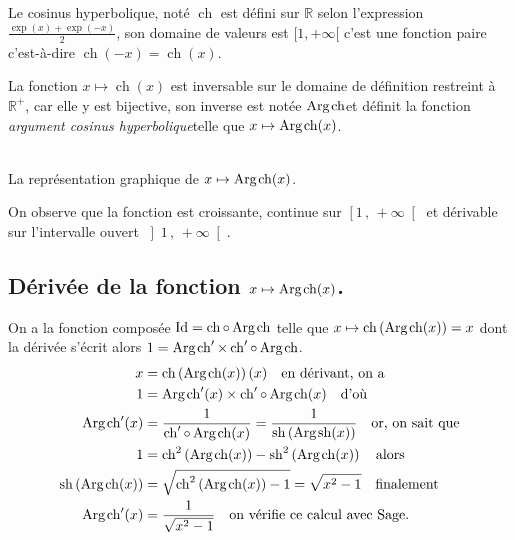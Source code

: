 \documentclass[a4paper,12pt]{report}
\def\eclaire{\mathbb}
\def\R{\ensuremath{\eclaire R}}
\def\Id{\ensuremath{\mathrm{Id}}}
\renewcommand{\sinh}{\mathop{\mathrm{sh}}}
\renewcommand{\cosh}{\mathop{\mathrm{ch}}}
\renewcommand{\arg}{\mathop{\mathrm{Arg}}}
\begin{document}
Le cosinus hyperbolique, noté $\cosh$ est défini sur $\R$ selon l'expression $\frac{\exp(x)+\exp(-x)}{2}$, son domaine de valeurs est $[1, +\infty [$ 
c'est une fonction paire c'est-à-dire $\cosh(-x)=\cosh(x)$.


La fonction $x \mapsto \cosh(x)$ est inversable sur le domaine de définition restreint à $\R^+$, car elle y est bijective, son inverse est notée \og $ \arg\mspace{-1mu}\cosh $\fg et définit la fonction \og\emph{argument cosinus hyperbolique}\fg telle que $x \mapsto \arg\mspace{-1mu}\cosh(x)$.


\begin{center}
 \\
La représentation graphique de $x \mapsto \arg\mspace{-1mu}\cosh(x)$.
\end{center}
On observe que la fonction est croissante, continue sur $\left[1\,,\,+\infty \right[ $ et dérivable sur l'intervalle ouvert $\left]1\,,\,+\infty \right[ $.
                                                                                               

\subsection{Dérivée de la fonction $x \mapsto \arg\mspace{-1mu}\cosh(x)$.}
On a la fonction composée $\Id = \cosh \circ \arg\mspace{-1mu}\cosh$ telle que $x\mapsto\cosh\left(\arg\mspace{-1mu}\cosh(x)\right)=x$ dont la dérivée s'écrit alors $1= \arg\mspace{-1mu}\cosh\nolimits' \times \cosh\nolimits'\circ\arg\mspace{-1mu}\cosh$.
\begin{align*}
x & =\cosh\left(\arg\mspace{-1mu}\cosh(x)\right)(x) \quad \textrm{en dérivant, on a}\\
1 & = \arg\mspace{-1mu}\cosh\nolimits'(x) \times \cosh\nolimits'\circ\arg\mspace{-1mu}\cosh(x) \quad \textrm{d'où}\\
\arg\mspace{-1mu}\cosh\nolimits'(x) & =\frac{1}{ \cosh\nolimits'\circ\arg\mspace{-1mu}\cosh(x)}=\frac{1}{ \sinh\left(\arg\mspace{-1mu}\sinh(x)\right)}\quad \textrm{or, on sait que}\\
1 & = \cosh\nolimits^2\left(\arg\mspace{-1mu}\cosh(x)\right) - \sinh\nolimits^2\left(\arg\mspace{-1mu}\cosh(x)\right) \quad \textrm{alors}\\
\sinh\left(\arg\mspace{-1mu}\cosh(x)\right) & = \sqrt{\cosh\nolimits^2\left(\arg\mspace{-1mu}\cosh(x)\right)-1}=\sqrt{x^2-1}\quad \textrm{finalement}\\
\arg\mspace{-1mu}\cosh\nolimits'(x) & = \frac{1}{ \sqrt{x^2-1}}\quad \textrm{on vérifie ce calcul avec Sage.}
\end{align*}
\end{document}
